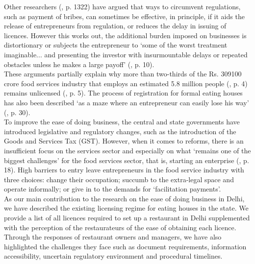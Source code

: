 \documentclass[a4paper, 12pt, twoside]{article}
\begin{document}
                    Other researchers (\cite{bardhan1997corruption}, p. 1322) have argued that ways to circumvent regulations, such as payment of bribes, can sometimes be effective, in principle, if it aids the release of entrepreneurs from regulation, or reduces the delay in issuing of licences. However this works out, the additional burden imposed on businesses is distortionary \parencite{djankov2002regulation} or subjects the entrepreneur to ‘some of the worst treatment imaginable... and presenting the investor with insurmountable delays or repeated obstacles unless he makes a large payoff’ (\cite{emery2000administrative}, p. 10).\\
                    
                    These arguments partially explain why more than two-thirds of the Rs. 309100 crore food services industry that employs an estimated 5.8 million people (\cite{kpmg2016foodservindustry}, p. 4) remains unlicensed (\cite{kpmg2016foodservindustry}, p. 5). The process of registration for formal eating houses has also been described ‘as a maze where an entrepreneur can easily lose his way’ (\cite{kaushikpd2013formalinformal}, p. 30). \\
                    
                    To improve the ease of doing business, the central and state governments have introduced legislative and regulatory changes, such as the introduction of the Goods and Services Tax (GST). However, when it comes to reforms, there is an insufficient 
focus on the services sector and especially on what ‘remains one of the biggest challenges’ for the food services sector, that is, starting an enterprise (\cite{kaushikpd2013formalinformal}, p. 18). High barriers to entry leave entrepreneurs in the food service industry with three choices: change their occupation; succumb to the extra-legal space and operate informally; or give in to the demands for ‘facilitation payments’.\\
                    
                    As our main contribution to the research on the ease of doing business in Delhi, we have described the existing licensing regime for eating houses in the state. We provide a list of all licences required to set up a restaurant in Delhi supplemented with 
the perception of the restaurateurs of the ease of obtaining each licence. Through the responses of restaurant owners and managers, we have also highlighted the challenges they face such as document requirements, information accessibility, uncertain regulatory 
environment and procedural timelines.\\
                    
\end{document}
